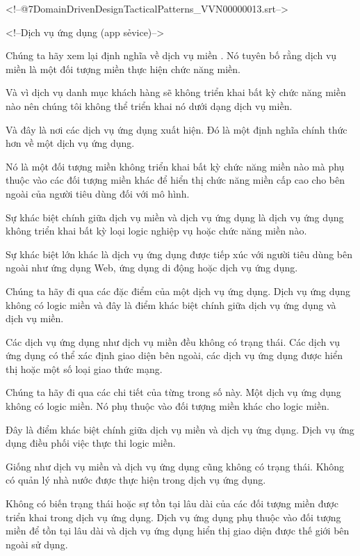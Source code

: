 

<!--@\07DomainDrivenDesignTacticalPatterns_VVN\000000013.srt-->

<!--Dịch vụ ứng dụng (app sẻvice)-->

Chúng ta hãy xem lại định nghĩa về dịch vụ miền . Nó tuyên bố rằng dịch vụ miền là một đối tượng miền thực hiện chức năng miền.

Và vì dịch vụ danh mục khách hàng sẽ không triển khai bất kỳ chức năng miền nào nên chúng tôi không thể triển khai nó dưới dạng dịch vụ miền.

Và đây là nơi các dịch vụ ứng dụng xuất hiện. Đó là một định nghĩa chính thức hơn về một dịch vụ ứng dụng.

Nó là một đối tượng miền không triển khai bất kỳ chức năng miền nào mà phụ thuộc vào các đối tượng miền khác để hiển thị chức năng miền cấp cao cho bên ngoài của người tiêu dùng đối với mô hình.

Sự khác biệt chính giữa dịch vụ miền và dịch vụ ứng dụng là dịch vụ ứng dụng không triển khai bất kỳ loại logic nghiệp vụ hoặc chức năng miền nào.

Sự khác biệt lớn khác là dịch vụ ứng dụng được tiếp xúc với người tiêu dùng bên ngoài như ứng dụng Web, ứng dụng di động hoặc dịch vụ ứng dụng.

Chúng ta hãy đi qua các đặc điểm của một dịch vụ ứng dụng. Dịch vụ ứng dụng không có logic miền và đây là điểm khác biệt chính giữa dịch vụ ứng dụng và dịch vụ miền.

Các dịch vụ ứng dụng như dịch vụ miền đều không có trạng thái. Các dịch vụ ứng dụng có thể xác định giao diện bên ngoài, các dịch vụ ứng dụng được hiển thị hoặc một số loại giao thức mạng.

Chúng ta hãy đi qua các chi tiết của từng trong số này. Một dịch vụ ứng dụng không có logic miền. Nó phụ thuộc vào đối tượng miền khác cho logic miền.

Đây là điểm khác biệt chính giữa dịch vụ miền và dịch vụ ứng dụng. Dịch vụ ứng dụng điều phối việc thực thi logic miền.

Giống như dịch vụ miền và dịch vụ ứng dụng cũng không có trạng thái. Không có quản lý nhà nước được thực hiện trong dịch vụ ứng dụng.

Không có biến trạng thái hoặc sự tồn tại lâu dài của các đối tượng miền được triển khai trong dịch vụ ứng dụng. Dịch vụ ứng dụng phụ thuộc vào đối tượng miền để tồn tại lâu dài và dịch vụ ứng dụng hiển thị giao diện được thế giới bên ngoài sử dụng.

